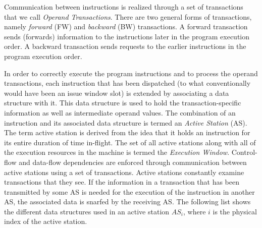 \documentclass[10pt,twocolumn]{IEEEtran}
\begin{document}
Communication between instructions is realized through a set of
transactions that we call \emph{Operand Transactions}.  
There are two
general forms of transactions, namely \emph{forward} (FW) and
\emph{backward} (BW) transactions.  
A forward transaction sends
(forwards) information to the instructions later in the program
execution order.  
A backward transaction sends requests to the
earlier instructions in the program execution order.

In order to correctly execute the program instructions and to process 
the operand transactions, each instruction that has been dispatched (to
what conventionally would have been an issue window slot) is extended
by associating a data structure with it.
This
data structure is used to hold the transaction-specific information
as well as intermediate operand values.  
The combination of an
instruction and its associated data structure is termed an
\emph{Active Station} (AS).  
The term active station is derived from the idea that it holds an
instruction for its entire duration of time in-flight.
The set of all active stations along with all of the execution 
resources in the machine is termed the \emph{Execution Window}.
Control-flow and data-flow dependencies are
enforced through communication between active stations using a set
of transactions.  
Active stations constantly examine
transactions that they see. 
If the information in a transaction that has been transmitted by
some AS is
needed for the execution of the instruction in another AS, the
associated data is snarfed by the receiving AS. 
The following list shows the different data 
structures used in an active station $AS_i$, where $i$ is the physical 
index of the active station.
%
\vspace{0.2 in}
\end{document}
